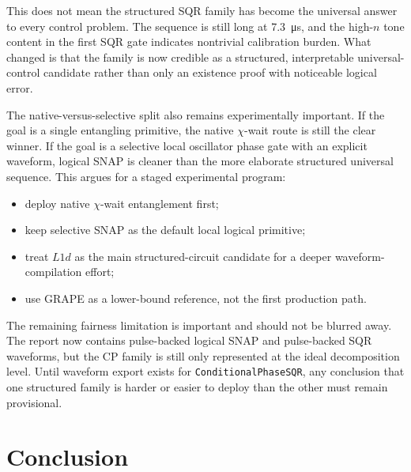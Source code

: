 \documentclass[11pt, a4paper]{article}
\begin{document}
This does not mean the structured SQR family has become the universal answer to every control problem. The sequence is still long at \SI{7.3}{\micro s}, and the high-$n$ tone content in the first SQR gate indicates nontrivial calibration burden. What changed is that the family is now credible as a structured, interpretable universal-control candidate rather than only an existence proof with noticeable logical error.

The native-versus-selective split also remains experimentally important. If the goal is a single entangling primitive, the native $\chi$-wait route is still the clear winner. If the goal is a selective local oscillator phase gate with an explicit waveform, logical SNAP is cleaner than the more elaborate structured universal sequence. This argues for a staged experimental program:
\begin{itemize}
\item deploy native $\chi$-wait entanglement first;
\item keep selective SNAP as the default local logical primitive;
\item treat $L1d$ as the main structured-circuit candidate for a deeper waveform-compilation effort;
\item use GRAPE as a lower-bound reference, not the first production path.
\end{itemize}

The remaining fairness limitation is important and should not be blurred away. The report now contains pulse-backed logical SNAP and pulse-backed SQR waveforms, but the CP family is still only represented at the ideal decomposition level. Until waveform export exists for \texttt{ConditionalPhaseSQR}, any conclusion that one structured family is harder or easier to deploy than the other must remain provisional.

\section{Conclusion}
\end{document}
